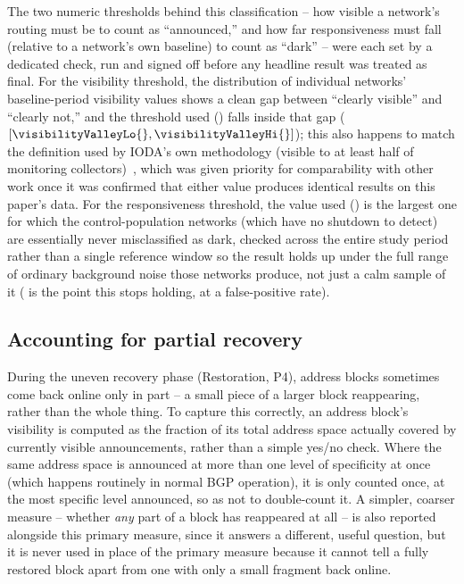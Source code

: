The two numeric thresholds behind this classification -- how visible a
network's routing must be to count as ``announced,'' and how far
responsiveness must fall (relative to a network's own baseline) to count as
``dark'' -- were each set by a dedicated check, run and signed off before any
headline result was treated as final. For the visibility threshold, the
distribution of individual networks' baseline-period visibility values
shows a clean gap between ``clearly visible'' and ``clearly not,'' and the
threshold used (\visibilityAnnouncedMin{}) falls inside that gap
($[\visibilityValleyLo{}, \visibilityValleyHi{}]$); this also happens to
match the definition used by IODA's own methodology (visible to at least
half of monitoring collectors)~\citep{alcock2024ioda}, which was given
priority for comparability with other work once it was confirmed that
either value produces identical results on this paper's data. For the
responsiveness threshold, the value used (\probingDarkRatio{}) is the
largest one for which the control-population networks (which have no
shutdown to detect) are essentially never misclassified as dark, checked
across the entire study period rather than a single reference window so
the result holds up under the full range of ordinary background noise
those networks produce, not just a calm sample of it
(\darkRatioCrossoverRatio{} is the point this stops holding, at a
\darkRatioCrossoverRate{} false-positive rate).

\subsection{Accounting for partial recovery}

During the uneven recovery phase (Restoration, P4), address blocks
sometimes come back online only in part -- a small piece of a larger block
reappearing, rather than the whole thing. To capture this correctly, an
address block's visibility is computed as the fraction of its total
address space actually covered by currently visible announcements, rather
than a simple yes/no check. Where the same address space is announced at
more than one level of specificity at once (which happens routinely in
normal BGP operation), it is only counted once, at the most specific level
announced, so as not to double-count it. A simpler, coarser measure --
whether \emph{any} part of a block has reappeared at all -- is also
reported alongside this primary measure, since it answers a different,
useful question, but it is never used in place of the primary measure
because it cannot tell a fully restored block apart from one with only a
small fragment back online.

